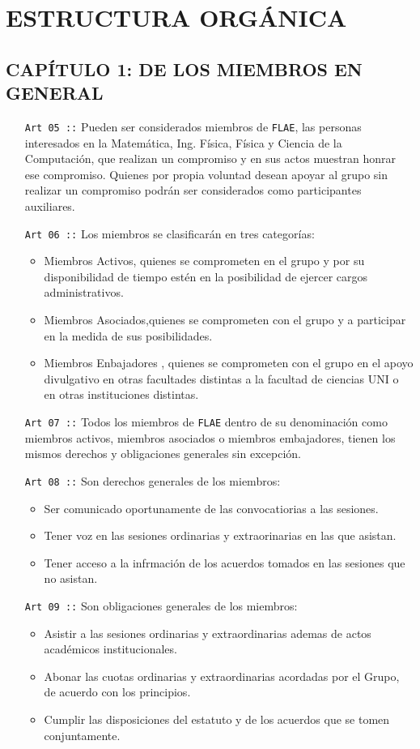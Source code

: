 \chapter {ESTRUCTURA ORGÁNICA}
\section*{CAPÍTULO 1: DE LOS MIEMBROS EN GENERAL}
\begin{itemize}
  \item [\texttt{Art 05 ::}] Pueden ser considerados miembros de \texttt{FLAE}, las personas interesados en la Matemática, Ing. Física, Física y Ciencia de la Computación,  que realizan un compromiso y en sus actos muestran honrar ese compromiso. Quienes por propia voluntad desean apoyar al grupo sin
  realizar un compromiso podrán ser considerados como participantes auxiliares.
  \item [\texttt{Art 06 ::}] Los miembros se clasificarán  en tres categorías:
    \begin{itemize}
      \item Miembros Activos, quienes se comprometen en el grupo y por su disponibilidad de tiempo estén en la posibilidad de ejercer cargos administrativos.
      \item Miembros Asociados,quienes se comprometen con el grupo y a participar en la medida de sus posibilidades.
      \item Miembros Enbajadores , quienes se comprometen con el grupo en el apoyo divulgativo en otras facultades distintas a la facultad de ciencias UNI o en otras instituciones distintas.
    \end{itemize}
  \item [\texttt{Art 07 ::}] Todos los miembros de \texttt{FLAE} dentro de su denominación como miembros activos, miembros asociados o miembros embajadores, tienen los mismos derechos y obligaciones generales sin excepción.
  \item [\texttt{Art 08 ::}] Son derechos generales de los miembros:
  \begin{itemize}
    \item Ser comunicado oportunamente de las convocatiorias a las sesiones.
    \item Tener voz en las sesiones ordinarias y extraorinarias en las que asistan.
    \item Tener acceso  a la infrmación de los acuerdos tomados en las sesiones que no asistan.
  \end{itemize}
  \item [\texttt{Art 09 ::}] Son obligaciones generales de los miembros:
  \begin{itemize}
    \item Asistir a las sesiones ordinarias y extraordinarias ademas de actos académicos institucionales.
    \item Abonar las cuotas ordinarias y extraordinarias acordadas por el Grupo, de acuerdo con los principios.
    \item Cumplir las disposiciones del estatuto y de los acuerdos que se tomen conjuntamente.
  \end{itemize}
\end{itemize}

